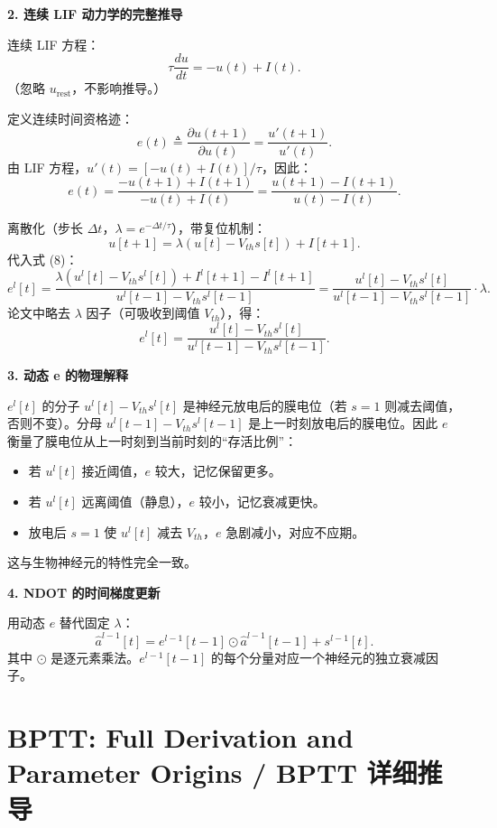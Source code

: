 \documentclass[journal,12pt,onecolumn]{IEEEtran}
\begin{document}
\medskip\noindent\textbf{2. 连续 LIF 动力学的完整推导}

连续 LIF 方程：
\[
\tau \frac{du}{dt} = -u(t) + I(t). \tag{1}
\]
（忽略 $u_{\text{rest}}$，不影响推导。）

定义连续时间资格迹：
\[
e(t) \triangleq \frac{\partial u(t+1)}{\partial u(t)} = \frac{u'(t+1)}{u'(t)}. \tag{7}
\]
由 LIF 方程，$u'(t) = [-u(t) + I(t)]/\tau$，因此：
\[
e(t) = \frac{-u(t+1) + I(t+1)}{-u(t) + I(t)} = \frac{u(t+1) - I(t+1)}{u(t) - I(t)}. \tag{8}
\]

离散化（步长 $\Delta t$，$\lambda = e^{-\Delta t/\tau}$），带复位机制：
\[
u[t+1] = \lambda(u[t] - V_{th}s[t]) + I[t+1].
\]
代入式 (8)：
\[
e^l[t] = \frac{\lambda(u^l[t] - V_{th}s^l[t]) + I^l[t+1] - I^l[t+1]}{u^l[t-1] - V_{th}s^l[t-1]} = \frac{u^l[t] - V_{th}s^l[t]}{u^l[t-1] - V_{th}s^l[t-1]} \cdot \lambda.
\]
论文中略去 $\lambda$ 因子（可吸收到阈值 $V_{th}$），得：
\[
\boxed{e^l[t] = \frac{u^l[t] - V_{th}s^l[t]}{u^l[t-1] - V_{th}s^l[t-1]}}. \tag{8}
\]

\medskip\noindent\textbf{3. 动态 e 的物理解释}

$e^l[t]$ 的分子 $u^l[t] - V_{th}s^l[t]$ 是神经元放电后的膜电位（若 $s=1$ 则减去阈值，否则不变）。分母 $u^l[t-1] - V_{th}s^l[t-1]$ 是上一时刻放电后的膜电位。因此 $e$ 衡量了膜电位从上一时刻到当前时刻的“存活比例”：
\begin{itemize}
    \item 若 $u^l[t]$ 接近阈值，$e$ 较大，记忆保留更多。
    \item 若 $u^l[t]$ 远离阈值（静息），$e$ 较小，记忆衰减更快。
    \item 放电后 $s=1$ 使 $u^l[t]$ 减去 $V_{th}$，$e$ 急剧减小，对应不应期。
\end{itemize}

这与生物神经元的特性完全一致。

\medskip\noindent\textbf{4. NDOT 的时间梯度更新}

用动态 $e$ 替代固定 $\lambda$：
\[
\hat{a}^{l-1}[t] = e^{l-1}[t-1] \odot \hat{a}^{l-1}[t-1] + s^{l-1}[t]. \tag{12}
\]
其中 $\odot$ 是逐元素乘法。$e^{l-1}[t-1]$ 的每个分量对应一个神经元的独立衰减因子。


\section{BPTT: Full Derivation and Parameter Origins / BPTT 详细推导}
\end{document}
